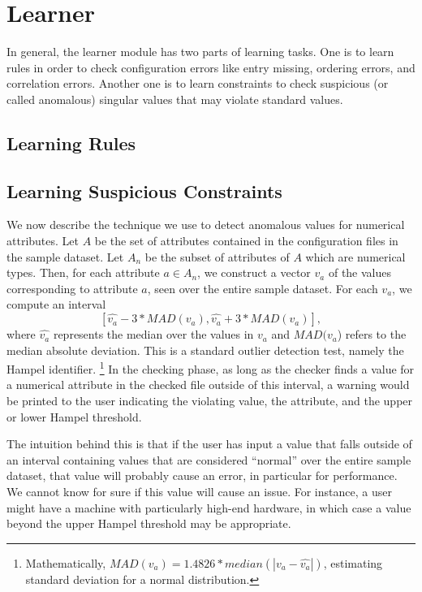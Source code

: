 
\section{Learner}
\label{sec-learn}


In general, the learner module has two parts of learning tasks.
One is to learn rules in order to check configuration errors like
entry missing, ordering errors, and correlation errors.
Another one is to learn constraints to check suspicious (or called
anomalous) singular values that may violate standard values.

\subsection{Learning Rules}
\label{subsec-rules}

\subsection{Learning Suspicious Constraints}
\label{subsec-constraints}

We now describe the technique we use to detect anomalous values for 
numerical attributes. Let $A$ be the set of attributes contained in the 
configuration files in the sample dataset. 
Let $A_n$ be the subset of attributes of $A$ which are numerical types. 
Then, for each attribute $a \in A_n$, we construct a vector $v_a$ of the 
values corresponding to attribute $a$, seen over the entire sample dataset.
For each $v_a$, we compute 
an interval  $$[\hat{v_a} - 3*MAD(v_a), \hat{v_a} + 3*MAD(v_a)],$$ 
where $\hat{v_a}$ represents the median over the values 
in $v_a$ and $MAD(v_a$) refers to the 
median absolute deviation. 
This is a standard outlier detection test, namely the Hampel identifier. 
\footnote{Mathematically, $MAD(v_a) = 1.4826* median(|v_a - \hat{v_a}|)$, estimating standard deviation 
for a normal distribution.} 
In the checking phase, as long as the checker finds a value for a numerical 
attribute in the checked file outside of this interval, 
a warning would be printed to the user indicating the violating value, 
the attribute, and the upper or lower Hampel threshold. 

The intuition behind this is that if the user has input a value 
that falls outside of an interval containing values that are considered 
``normal'' over the entire sample dataset, 
that value will probably cause an error, in particular for performance. 
We cannot know for sure if this value will cause an issue. 
For instance, a user might have a machine with 
particularly high-end hardware, 
in which case a value beyond the upper Hampel threshold may be appropriate. 
